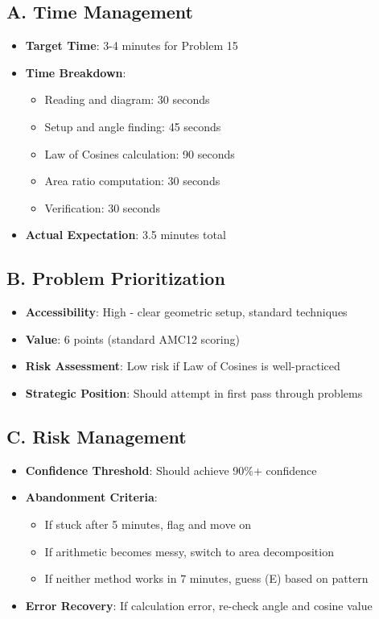 \documentclass[11pt]{article}
\begin{document}
\begin{competitionbox}
\subsection*{A. Time Management}
\begin{itemize}[leftmargin=*]
    \item \textbf{Target Time}: 3-4 minutes for Problem 15
    \item \textbf{Time Breakdown}:
    \begin{itemize}
        \item Reading and diagram: 30 seconds
        \item Setup and angle finding: 45 seconds
        \item Law of Cosines calculation: 90 seconds
        \item Area ratio computation: 30 seconds
        \item Verification: 30 seconds
    \end{itemize}
    \item \textbf{Actual Expectation}: 3.5 minutes total
\end{itemize}

\subsection*{B. Problem Prioritization}
\begin{itemize}[leftmargin=*]
    \item \textbf{Accessibility}: High - clear geometric setup, standard techniques
    \item \textbf{Value}: 6 points (standard AMC12 scoring)
    \item \textbf{Risk Assessment}: Low risk if Law of Cosines is well-practiced
    \item \textbf{Strategic Position}: Should attempt in first pass through problems
\end{itemize}

\subsection*{C. Risk Management}
\begin{itemize}[leftmargin=*]
    \item \textbf{Confidence Threshold}: Should achieve 90\%+ confidence
    \item \textbf{Abandonment Criteria}:
    \begin{itemize}
        \item If stuck after 5 minutes, flag and move on
        \item If arithmetic becomes messy, switch to area decomposition
        \item If neither method works in 7 minutes, guess (E) based on pattern
    \end{itemize}
    \item \textbf{Error Recovery}: If calculation error, re-check angle and cosine value
\end{itemize}
\end{competitionbox}
\end{document}
